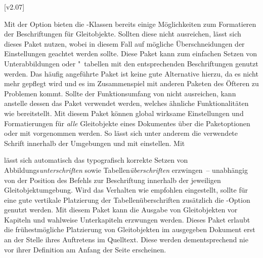 [v2.07]
%
%
\begin{DeclarePackages}
  Mit der Option  bieten die 
  \KOMAScript-Klassen bereits einige Möglichkeiten zum Formatieren der 
  Beschriftungen für Gleitobjekte. Sollten diese nicht ausreichen, lässt sich 
  dieses Paket nutzen, wobei in diesem Fall auf mögliche Überschneidungen der 
  Einstellungen geachtet werden sollte.
  Diese Paket kann zum einfachen Setzen von Unterabbildungen oder "~tabellen 
  mit den entsprechenden Beschriftungen genutzt werden. Das häufig angeführte 
  Paket  ist keine gute Alternative hierzu, da es nicht mehr 
  gepflegt wird und es im Zusammenspiel mit anderen Paketen des Öfteren zu 
  Problemen kommt. Sollte der Funktionsumfang von  nicht 
  ausreichen, kann anstelle dessen das Paket  verwendet 
  werden, welches ähnliche Funktionalitäten wie  bereitstellt.
  Mit diesem Paket können global wirksame Einstellungen und Formatierungen für 
  \emph{alle} Gleitobjekte eines Dokumentes über die Paketoptionen oder mit 
   vorgenommen werden. So lässt sich unter 
  anderem die verwendete Schrift innerhalb der Umgebungen  
  und  mit  
  einstellen. Mit 
\begin{quoting}[rightmargin=0pt]
\begin{Code}
\end{Code}
\end{quoting}
  lässt sich automatisch das typografisch korrekte Setzen von 
  Abbildungs\emph{unterschriften} sowie Tabellen\emph{überschriften} 
  erzwingen~-- unabhängig von der Position des Befehls zur Beschriftung 
   innerhalb der jeweiligen Gleitobjektumgebung. Wird das 
  Verhalten wie empfohlen eingestellt, sollte für eine gute vertikale 
  Platzierung der Tabellenüberschriften zusätzlich die \KOMAScript-Option 
   genutzt werden.
  Mit diesem Paket kann die Ausgabe von Gleitobjekten vor Kapiteln und wahlweise
  Unterkapiteln erzwungen werden.
  Dieses Paket erlaubt die frühestmögliche Platzierung von Gleitobjekten im 
  ausgegeben Dokument erst an der Stelle ihres Auftretens im Quelltext. Diese 
  werden dementsprechend nie vor ihrer Definition am Anfang der Seite 
  erscheinen.
\end{DeclarePackages}
%



